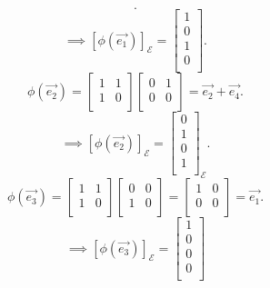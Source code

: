 \documentclass{report}
\begin{document}
{\[        .\] 
        \[
        \implies \left[ \phi \left( \vec{ e_1}  \right)  \right] _{ \mathcal{E}} = \begin{bmatrix}
        1\\
        0\\
        1\\
        0\\
        \end{bmatrix}
        .\] 
        \[
        \phi \left( \vec{ e_2}  \right) = \begin{bmatrix}
        1 & 1\\
        1 & 0\\
        \end{bmatrix} \begin{bmatrix}
        0 & 1\\
        0 & 0\\
        \end{bmatrix} = \vec{ e_2} + \vec{ e_4}
        .\] 
        \[
        \implies \left[ \phi \left( \vec{ e_2}  \right)  \right] _{ \mathcal{E}} = \begin{bmatrix}
        0\\
        1\\
        0\\
        1\\
        \end{bmatrix}
          _{ \mathcal{E}}
        .\] 
        \[
        \phi \left( \vec{ e_3}  \right) = \begin{bmatrix}
        1 & 1\\
        1 & 0\\
        \end{bmatrix} \begin{bmatrix}
        0 & 0\\
        1 & 0\\
        \end{bmatrix} = \begin{bmatrix}
        1 & 0\\
        0 & 0\\
        \end{bmatrix} = \vec{ e_1}
        .\] 
        \[
        \implies \left[ \phi \left( \vec{ e_3}  \right)  \right] _{ \mathcal{E}} = \begin{bmatrix}
        1\\
        0\\
        0\\
        0\\
        \end{bmatrix}
\]}
\end{document}
